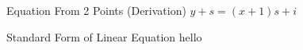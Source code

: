 \documentclass{book}
\begin{document}

  {\remark Equation From 2 Points (Derivation)
    $y + s = (x + 1)s + i$
  }

  {\remark Standard Form of Linear Equation 
    hello
  }
\end{document}
